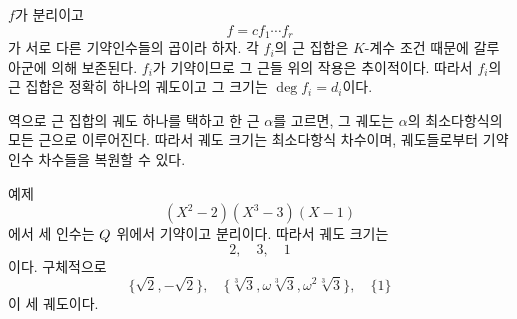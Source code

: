 \begin{solution}
$f$가 분리이고
\[
  f=c f_1\cdots f_r
\]
가 서로 다른 기약인수들의 곱이라 하자. 각 $f_i$의 근 집합은 $K$-계수 조건 때문에 갈루아군에 의해 보존된다. $f_i$가 기약이므로 그 근들 위의 작용은 추이적이다. 따라서 $f_i$의 근 집합은 정확히 하나의 궤도이고 그 크기는 $\deg f_i=d_i$이다.

역으로 근 집합의 궤도 하나를 택하고 한 근 $\alpha$를 고르면, 그 궤도는 $\alpha$의 최소다항식의 모든 근으로 이루어진다. 따라서 궤도 크기는 최소다항식 차수이며, 궤도들로부터 기약인수 차수들을 복원할 수 있다.

예제
\[
  (X^2-2)(X^3-3)(X-1)
\]
에서 세 인수는 $Q$ 위에서 기약이고 분리이다. 따라서 궤도 크기는
\[
  2,\quad3,\quad1
\]
이다. 구체적으로
\[
  \{\sqrt2,-\sqrt2\},
  \quad
  \{\sqrt[3]{3},\omega\sqrt[3]{3},\omega^2\sqrt[3]{3}\},
  \quad
  \{1\}
\]
이 세 궤도이다.
\end{solution}
